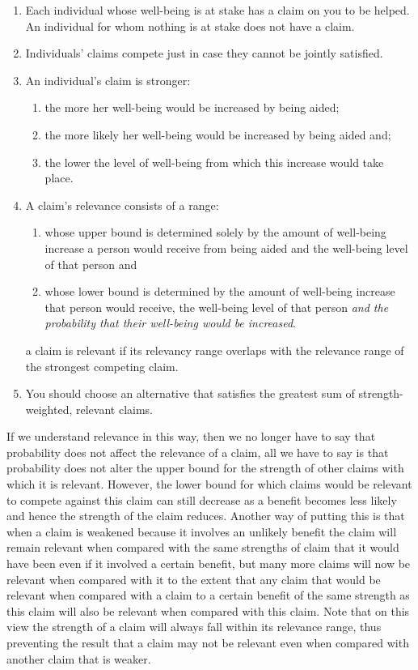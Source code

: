 \documentclass[man,11pt,a4paper]{apa7}
\begin{document}
\begin{enumerate}[label=\arabic*.]
\item Each individual whose well-being is at stake has a claim on you to be helped. An individual for whom nothing is at stake does not have a claim.
\item Individuals' claims compete just in case they cannot be jointly satisfied.
\item An individual's claim is stronger:
\begin{enumerate}[label=\alph*.]
\item the more her well-being would be increased by being aided;
\item the more likely her well-being would be increased by being aided and;
\item the lower the level of well-being from which this increase would take place.
\end{enumerate}
\item A claim's relevance consists of a range:
\begin{enumerate}[label=\alph*.]
\item whose upper bound is determined solely by the amount of well-being increase a person would receive from being aided and the well-being level of that person and
\item whose lower bound is determined by the amount of well-being increase that person would receive, the well-being level of that person \textit{and the probability that their well-being would be increased}.
\end{enumerate}
\par a claim is relevant if its relevancy range overlaps with the relevance range of the strongest competing claim.
\item You should choose an alternative that satisfies the greatest sum of strength-weighted, relevant claims.
\end{enumerate}

If we understand relevance in this way, then we no longer have to say that probability does not affect the relevance of a claim, all we have to say is that probability does not alter the upper bound for the strength of other claims with which it is relevant. However, the lower bound for which claims would be relevant to compete against this claim can still decrease as a benefit becomes less likely and hence the strength of the claim reduces. Another way of putting this is that when a claim is weakened because it involves an unlikely benefit the claim will remain relevant when compared with the same strengths of claim that it would have been even if it involved a certain benefit, but many more claims will now be relevant when compared with it to the extent that any claim that would be relevant when compared with a claim to a certain benefit of the same strength as this claim will also be relevant when compared with this claim. Note that on this view the strength of a claim will always fall within its relevance range, thus preventing the result that a claim may not be relevant even when compared with another claim that is weaker.
\end{document}
